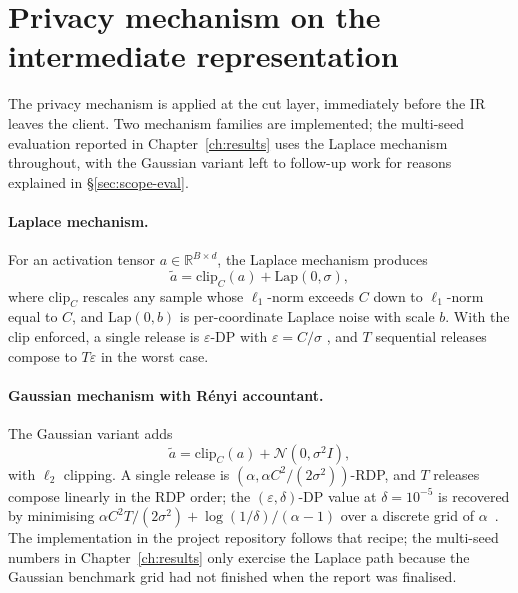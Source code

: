 \documentclass[11pt,a4paper,oneside]{report}
\begin{document}
\section{Privacy mechanism on the intermediate representation}

The privacy mechanism is applied at the cut layer, immediately before
the IR leaves the client. Two mechanism families are implemented; the
multi-seed evaluation reported in Chapter~\ref{ch:results} uses the
Laplace mechanism throughout, with the Gaussian variant left to
follow-up work for reasons explained in
\S\ref{sec:scope-eval}.

\paragraph{Laplace mechanism.}
For an activation tensor $a \in \mathbb{R}^{B \times d}$, the
Laplace mechanism produces
\begin{equation}
 \tilde{a} = \mathrm{clip}_{C}(a) + \mathrm{Lap}(0, \sigma),
 \label{eq:laplace}
\end{equation}
where $\mathrm{clip}_{C}$ rescales any sample whose $\ell_1$-norm
exceeds $C$ down to $\ell_1$-norm equal to $C$, and
$\mathrm{Lap}(0, b)$ is per-coordinate Laplace noise with scale $b$.
With the clip enforced, a single release is
$\varepsilon$-DP with $\varepsilon = C / \sigma$
\cite{dwork2014algofoundations}, and $T$ sequential releases compose
to $T \varepsilon$ in the worst case.

\paragraph{Gaussian mechanism with R\'enyi accountant.}
The Gaussian variant adds
\begin{equation}
 \tilde{a} = \mathrm{clip}_{C}(a) + \mathcal{N}(0, \sigma^2 I),
 \label{eq:gaussian}
\end{equation}
with $\ell_2$ clipping. A single release is
$(\alpha, \alpha C^2 / (2\sigma^2))$-RDP, and $T$ releases compose
linearly in the RDP order; the
$(\varepsilon, \delta)$-DP value at $\delta = 10^{-5}$ is recovered
by minimising $\alpha C^2 T / (2\sigma^2) + \log(1/\delta)/(\alpha-1)$
over a discrete grid of $\alpha$~\cite{mironov2017rdp}. The
implementation in the project repository follows that recipe; the
multi-seed numbers in Chapter~\ref{ch:results} only exercise the
Laplace path because the Gaussian benchmark grid had not finished
when the report was finalised.
\end{document}
